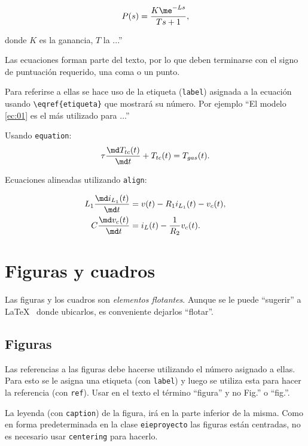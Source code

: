 \begin{equation}  %
	P(s) = \frac{K \me^{-Ls}}{Ts+1}, \label{ec:01}
\end{equation}

\noindent donde $K$ es la ganancia, $T$ la ...''  

Las ecuaciones forman parte del texto, por lo que deben terminarse con el signo de puntuación requerido, una coma o un punto.

Para referirse a ellas se hace uso de la etiqueta (\texttt{label}) asignada a la ecuación usando \texttt{\textbackslash eqref\{etiqueta\}} que mostrará su número.  Por ejemplo ``El modelo \eqref{ec:01} es el más utilizado para ...''

Usando \texttt{equation}:
\begin{equation}
	\tau \frac{\md T_{tc}(t)}{\md t} + T_{tc}(t) = T_{gas}(t).
\end{equation}

Ecuaciones alineadas utilizando \texttt{align}:

\begin{align}
	L_1 \frac{\md i_{L_1} (t)}{\md t} &= v(t) - R_1 i_{L_1}(t) - v_c(t), \\
	C \frac{\md v_c (t)}{\md t} &= i_L(t)- \frac{1}{R_2} v_c(t).
\end{align}

\section{Figuras y cuadros}
Las figuras y los cuadros son \emph{elementos flotantes}. Aunque se le puede ``sugerir'' a \LaTeX~ donde ubicarlos, es conveniente dejarlos ``flotar''.

\subsection{Figuras}
Las referencias a las figuras debe hacerse utilizando el número asignado a ellas.  Para esto se le asigna una etiqueta (con \texttt{label}) y luego se utiliza esta para hacer la referencia (con \texttt{ref}).  Usar en el texto el término ``figura'' y no Fig.'' o ``fig.''.

La leyenda (con \texttt{caption}) de la figura, irá en la parte inferior de la misma.  Como en forma predeterminada en la clase \texttt{eieproyecto} las figuras están centradas, no es necesario usar \texttt{centering} para hacerlo.

